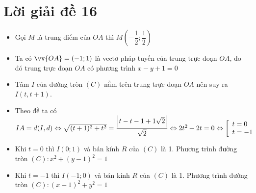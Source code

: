 \section{Lời giải đề 16}
\lgi 
\begin{itemize}[label=, leftmargin=*]
\item Gọi $M$ là trung điểm của $OA$ thì $M\left(-\dfrac{1}{2};\dfrac{1}{2} \right)$
\item Ta có $\vv{OA}=(-1;1)$ là vectơ pháp tuyến của trung trực đoạn $OA$, do đó trung trực đoạn $OA$ có phương trình $x-y+1=0$
\item Tâm $I$ của đường tròn $(C)$ nằm trên trung trực đoạn $OA$ nên suy ra $I(t,t+1)$.
\item Theo đề ta có $IA=d(I,d)\Leftrightarrow \sqrt{(t+1)^2+t^2}=\dfrac{\left|t-t-1+1\sqrt{2} \right|}{\sqrt{2}}\Leftrightarrow 2t^2+2t=0\Leftrightarrow \left[\begin{array}{ll}t=0 \\ t=-1\end{array}\right.$ 
\item Khi $t=0$ thì $I(0;1)$ và bán kính $R$ của $(C)$ là 1. Phương trình đường tròn $(C):x^2+(y-1)^2=1$
\item Khi $t=-1$ thì $I(-1;0)$ và bán kính $R$ của $(C)$ là 1. Phương trình đường tròn $(C):(x+1)^2+y^2=1$
\end{itemize}

